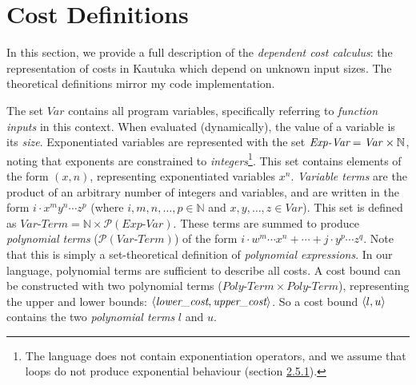 \label{sec:C}

\section*{Cost Definitions}

In this section, we provide a full description of the \textit{dependent cost calculus}: the representation of costs in Kautuka which depend on unknown input sizes. The theoretical definitions mirror my code implementation.

The set \( \textit{Var} \) contains all program variables, specifically referring to \textit{function inputs} in this context. When evaluated (dynamically), the value of a variable is its \textit{size}. Exponentiated variables are represented with the set \( \textit{Exp\text{-}Var} = \mathit{Var} \times \mathbb{N} \), noting that exponents are constrained to \textit{integers}\footnote{The language does not contain exponentiation operators, and we assume that loops do not produce exponential behaviour (section \hyperref[sec:2.5.1]{2.5.1}).}. This set contains elements of the form \( (x, n) \), representing exponentiated variables \( x^n \). \textit{Variable terms} are the product of an arbitrary number of integers and variables, and are written in the form \( i \cdot x^m y^n \cdots z^p \) (where \(i, m, n, \ldots, p \in \mathbb{N} \) and \(x, y, \ldots, z \in \textit{Var} \)). This set is defined as \( {\mathit{Var\text{-}Term} = \mathbb{N} \times \mathscr{P}(\mathit{Exp\text{-}Var})} \). These terms are summed to produce \textit{polynomial terms} (\( \mathscr{P}(\mathit{Var\text{-}Term}) \)) of the form \( i \cdot {w^m} \cdots {x^n} + \cdots + j \cdot {y^p} \cdots {z^q} \). Note that this is simply a set-theoretical definition of \textit{polynomial expressions}. In our language, polynomial terms are sufficient to describe all costs. A cost bound can be constructed with two polynomial terms (\( \mathit{Poly\text{-}Term}    \times \mathit{Poly\text{-}Term} \)), representing the upper and lower bounds: \( { \langle{\textit{lower\_cost}, \textit{upper\_cost}}\rangle } \). So a cost bound \( \langle{l, u}\rangle \) contains the two \textit{polynomial terms} \( l \) and \( u \).



